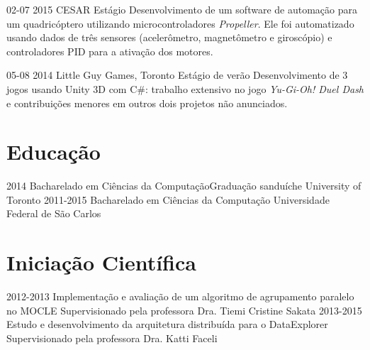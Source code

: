 \documentclass[]{friggeri-cv}
\begin{document}
\begin{entrylist}
  \entry
    {02-07 2015}
    {CESAR}
    {Estágio}
    {Desenvolvimento de um software de automação para um quadricóptero utilizando microcontroladores \emph{Propeller}. Ele foi automatizado usando dados de três sensores (acelerômetro, magnetômetro e giroscópio) e controladores PID para a ativação dos motores.}
    
    
  \entry
    {05-08 2014}
    {Little Guy Games, Toronto}
    {Estágio de verão}
    {Desenvolvimento de 3 jogos usando Unity 3D com C\#: trabalho extensivo no jogo \emph{Yu-Gi-Oh! Duel Dash} e contribuições menores em outros dois projetos não anunciados.}
    
\end{entrylist}



\section{Educação}

\begin{entrylist}
  \entry
    {2014}
    {Bacharelado em Ciências da Computação}{Graduação sanduíche}
    {University of Toronto}
  \entry
    {2011-2015}
    {Bacharelado em Ciências da Computação}{}
    {Universidade Federal de São Carlos}
\end{entrylist}


\section{Iniciação Científica}

\begin{entrylist}

\entry
    {2012-2013}
    {Implementação e avaliação de um algoritmo de agrupamento paralelo no MOCLE}{}
    {Supervisionado pela professora Dra. Tiemi Cristine Sakata}
\entry 
    {2013-2015}
{Estudo e desenvolvimento da arquitetura distribuída para o DataExplorer}{}
{Supervisionado pela professora Dra. Katti Faceli}

\end{entrylist}
  
\end{document}
